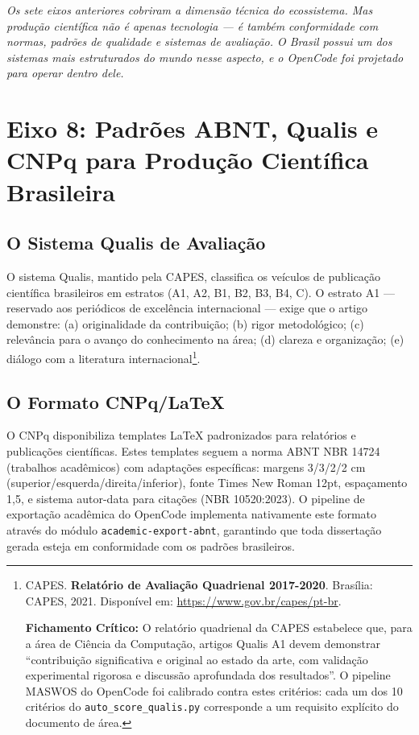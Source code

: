 {\small\itshape Os sete eixos anteriores cobriram a dimensão técnica do ecossistema. Mas produção científica não é apenas tecnologia — é também conformidade com normas, padrões de qualidade e sistemas de avaliação. O Brasil possui um dos sistemas mais estruturados do mundo nesse aspecto, e o OpenCode foi projetado para operar dentro dele.}

\section{Eixo 8: Padrões ABNT, Qualis e CNPq para Produção Científica Brasileira}

\subsection{O Sistema Qualis de Avaliação}

O sistema Qualis, mantido pela CAPES, classifica os veículos de publicação científica brasileiros em estratos (A1, A2, B1, B2, B3, B4, C). O estrato A1 --- reservado aos periódicos de excelência internacional --- exige que o artigo demonstre: (a) originalidade da contribuição; (b) rigor metodológico; (c) relevância para o avanço do conhecimento na área; (d) clareza e organização; (e) diálogo com a literatura internacional\footnote{
  CAPES. \textbf{Relatório de Avaliação Quadrienal 2017-2020}. Brasília: CAPES, 2021. Disponível em: \url{https://www.gov.br/capes/pt-br}.

  \textbf{Fichamento Crítico:} O relatório quadrienal da CAPES estabelece que, para a área de Ciência da Computação, artigos Qualis A1 devem demonstrar ``contribuição significativa e original ao estado da arte, com validação experimental rigorosa e discussão aprofundada dos resultados''. O pipeline MASWOS do OpenCode foi calibrado contra estes critérios: cada um dos 10 critérios do \texttt{auto\_score\_qualis.py} corresponde a um requisito explícito do documento de área.
}.

\subsection{O Formato CNPq/LaTeX}

O CNPq disponibiliza templates LaTeX padronizados para relatórios e publicações científicas. Estes templates seguem a norma ABNT NBR 14724 (trabalhos acadêmicos) com adaptações específicas: margens 3/3/2/2 cm (superior/esquerda/direita/inferior), fonte Times New Roman 12pt, espaçamento 1,5, e sistema autor-data para citações (NBR 10520:2023). O pipeline de exportação acadêmica do OpenCode implementa nativamente este formato através do módulo \texttt{academic-export-abnt}, garantindo que toda dissertação gerada esteja em conformidade com os padrões brasileiros.

\newpage
